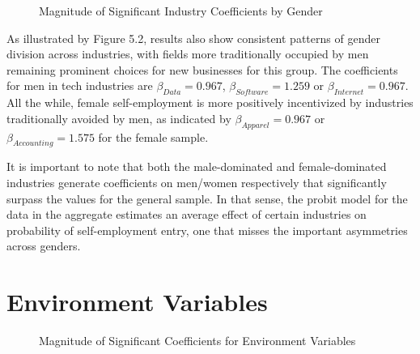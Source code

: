 \begin{figure}[hbtp]
    \caption{Magnitude of Significant Industry Coefficients by Gender} 
\end{figure}

As illustrated by Figure 5.2, results also show consistent patterns of gender division across industries, with fields more traditionally occupied by men remaining prominent choices for new businesses for this group. The coefficients for men in tech industries are $\beta_{Data} = 0.967$, $\beta_{Software} = 1.259$ or $\beta_{Internet} = 0.967$. All the while, female self-employment is more positively incentivized by industries traditionally avoided by men, as indicated by $\beta_{Apparel} = 0.967$ or $\beta_{Accounting} = 1.575$ for the female sample.

It is important to note that both the male-dominated and female-dominated industries generate coefficients on men/women respectively that significantly surpass the values for the general sample. In that sense, the probit model for the data in the aggregate estimates an average effect of certain industries on probability of self-employment entry, one that misses the important asymmetries across genders. 

\section{Environment Variables}

\begin{figure}[hbtp]
    \caption{Magnitude of Significant Coefficients for Environment Variables} 
\end{figure}


